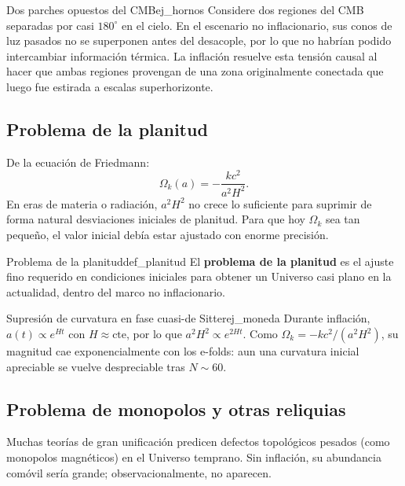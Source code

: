 \begin{ejemplo}{Dos parches opuestos del CMB}{ej_hornos}
Considere dos regiones del CMB separadas por casi $180^\circ$ en el cielo. En el escenario no inflacionario, sus conos de luz pasados no se superponen antes del desacople, por lo que no habrían podido intercambiar información térmica. La inflación resuelve esta tensión causal al hacer que ambas regiones provengan de una zona originalmente conectada que luego fue estirada a escalas superhorizonte.
\end{ejemplo}

\subsection{Problema de la planitud}

De la ecuación de Friedmann:
\begin{equation}
  \Omega_k(a)= -\frac{k c^2}{a^2H^2}.
\end{equation}
En eras de materia o radiación, $a^2H^2$ no crece lo suficiente para suprimir de forma natural desviaciones iniciales de planitud. Para que hoy $\Omega_k$ sea tan pequeño, el valor inicial debía estar ajustado con enorme precisión.

\begin{definicion}{Problema de la planitud}{def_planitud}
El \textbf{problema de la planitud} es el ajuste fino requerido en condiciones iniciales para obtener un Universo casi plano en la actualidad, dentro del marco no inflacionario.
\end{definicion}

\begin{ejemplo}{Supresión de curvatura en fase cuasi-de Sitter}{ej_moneda}
Durante inflación, $a(t)\propto e^{Ht}$ con $H\approx\text{cte}$, por lo que $a^2H^2\propto e^{2Ht}$. Como $\Omega_k=-kc^2/(a^2H^2)$, su magnitud cae exponencialmente con los e-folds: aun una curvatura inicial apreciable se vuelve despreciable tras $N\sim 60$.
\end{ejemplo}

\subsection{Problema de monopolos y otras reliquias}

Muchas teorías de gran unificación predicen defectos topológicos pesados (como monopolos magnéticos) en el Universo temprano. Sin inflación, su abundancia comóvil sería grande; observacionalmente, no aparecen.

